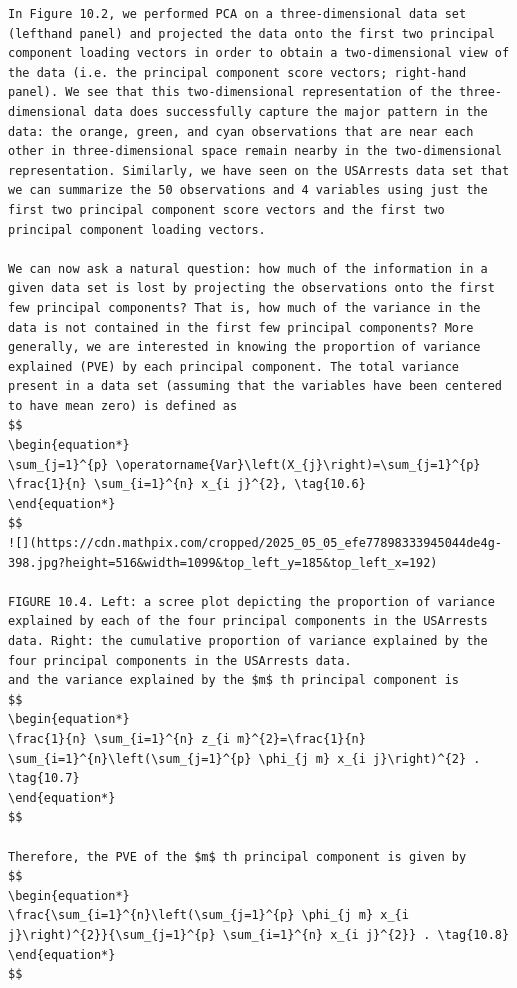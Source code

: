 \documentclass[10pt]{article}
\begin{document}
\begin{verbatim}
In Figure 10.2, we performed PCA on a three-dimensional data set (lefthand panel) and projected the data onto the first two principal component loading vectors in order to obtain a two-dimensional view of the data (i.e. the principal component score vectors; right-hand panel). We see that this two-dimensional representation of the three-dimensional data does successfully capture the major pattern in the data: the orange, green, and cyan observations that are near each other in three-dimensional space remain nearby in the two-dimensional representation. Similarly, we have seen on the USArrests data set that we can summarize the 50 observations and 4 variables using just the first two principal component score vectors and the first two principal component loading vectors.

We can now ask a natural question: how much of the information in a given data set is lost by projecting the observations onto the first few principal components? That is, how much of the variance in the data is not contained in the first few principal components? More generally, we are interested in knowing the proportion of variance explained (PVE) by each principal component. The total variance present in a data set (assuming that the variables have been centered to have mean zero) is defined as
$$
\begin{equation*}
\sum_{j=1}^{p} \operatorname{Var}\left(X_{j}\right)=\sum_{j=1}^{p} \frac{1}{n} \sum_{i=1}^{n} x_{i j}^{2}, \tag{10.6}
\end{equation*}
$$
![](https://cdn.mathpix.com/cropped/2025_05_05_efe77898333945044de4g-398.jpg?height=516&width=1099&top_left_y=185&top_left_x=192)

FIGURE 10.4. Left: a scree plot depicting the proportion of variance explained by each of the four principal components in the USArrests data. Right: the cumulative proportion of variance explained by the four principal components in the USArrests data.
and the variance explained by the $m$ th principal component is
$$
\begin{equation*}
\frac{1}{n} \sum_{i=1}^{n} z_{i m}^{2}=\frac{1}{n} \sum_{i=1}^{n}\left(\sum_{j=1}^{p} \phi_{j m} x_{i j}\right)^{2} . \tag{10.7}
\end{equation*}
$$

Therefore, the PVE of the $m$ th principal component is given by
$$
\begin{equation*}
\frac{\sum_{i=1}^{n}\left(\sum_{j=1}^{p} \phi_{j m} x_{i j}\right)^{2}}{\sum_{j=1}^{p} \sum_{i=1}^{n} x_{i j}^{2}} . \tag{10.8}
\end{equation*}
$$


\end{verbatim}
\end{document}

